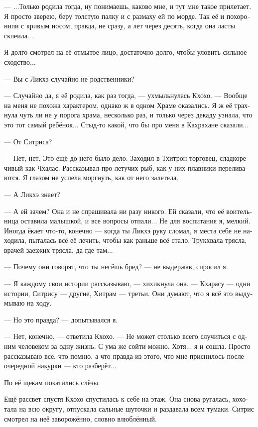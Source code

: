 \documentclass[a4paper,12pt,fleqn]{book}\usepackage{cooltooltips}\usepackage{polyglossia}\setdefaultlanguage[babelshorthands=true]{russian}\setotherlanguage{english}\defaultfontfeatures{Ligatures=TeX,Mapping=tex-text} \usepackage{xcolor}\definecolor{lightgray}{HTML}{bbbbbb}\color{lightgray}\newcommand{\ml}[3]{\textenglish{\textcolor{black}{#3}}}
\begin{document}
{---  ...Только родила тогда, ну понимаешь, каково мне, и тут мне такое прилетает.
Я просто зверею, беру толстую палку и с размаху ей по морде.
Так её и похоронили с кривым носом, правда, не сразу, а лет через десять, когда она ласты склеила...

Я долго смотрел на её отмытое лицо, достаточно долго, чтобы уловить сильное сходство...

--- Вы с Ликхэ случайно не родственники?

--- Случайно да, я её родила, как раз тогда, --- ухмыльнулась Кхохо.
--- Вообще на меня не похожа характером, однако ж в одном Храме оказались.
Я ж её трахнула чуть ли не у порога храма, несколько раз, и только через декаду узнала, что это тот самый ребёнок...
Стыд-то какой, что бы про меня в Кахрахане сказали...

--- От Ситриса?

--- Нет, нет.
Это ещё до него было дело.
Заходил в Тхитрон торговец, сладкоречивый как Чхалас.
Рассказывал про летучих рыб, как у них плавники переливаются.
Я глазом не успела моргнуть, как от него залетела.

--- А Ликхэ знает?

--- А ей зачем?
Она и не спрашивала ни разу никого.
Ей сказали, что её воительница оставила малышкой, и все вопросы отпали...
Не для воспитания я, мелкий.
Иногда ёкает что-то, конечно --- когда ты Ликхэ руку сломал, я места себе не находила, пыталась всё её лечить, чтобы как раньше всё стало, Трукхвала трясла, врачей заезжих трясла, да где там...

--- Почему они говорят, что ты несёшь бред? --- не выдержав, спросил я.

--- Я каждому свои истории рассказываю, --- хихикнула она.
--- Кхарасу --- одни истории, Ситрису --- другие, Хитрам --- третьи.
Они думают, что я всё это выдумываю на ходу.

--- Но это правда? --- допытывался я.

--- Нет, конечно, --- ответила Кхохо.
--- Не может столько всего случиться с одним человеком за одну жизнь.
С ума же сойти можно.
Хотя... я и сошла.
Просто рассказываю всё, что помню, а что правда из этого, что мне приснилось после очередной накурки --- кто разберёт...

По её щекам покатились слёзы.

Ещё рассвет спустя Кхохо спустилась к себе на этаж.
Она снова ругалась, хохотала на всю округу, отпускала сальные шуточки и раздавала всем тумаки.
Ситрис смотрел на неё заворожённо, словно влюблённый.

}
\end{document}
